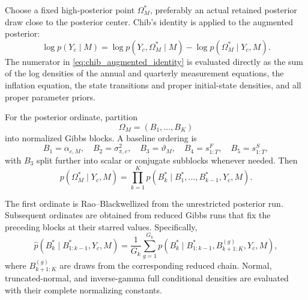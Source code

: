 \documentclass[11pt]{article}
\begin{document}
Choose a fixed high-posterior point \(\Omega_M^{\ast}\), preferably an actual retained posterior draw close to the posterior center. Chib's identity is applied to the augmented posterior:
\begin{equation}
\boxed{
\log p(Y_c\mid M)
=
\log p(Y_c,\Omega_M^{\ast}\mid M)
-
\log p(\Omega_M^{\ast}\mid Y_c,M).
}
\label{eq:chib_augmented_identity}
\end{equation}
The numerator in \cref{eq:chib_augmented_identity} is evaluated directly as the sum of the log densities of the annual and quarterly measurement equations, the inflation equation, the state transitions and proper initial-state densities, and all proper parameter priors.

For the posterior ordinate, partition
\begin{equation}
\Omega_M=(B_1,\ldots,B_K)
\end{equation}
into normalized Gibbs blocks. A baseline ordering is
\begin{equation}
B_1=\alpha_{c,M},
\quad
B_2=\sigma_{\pi,c}^2,
\quad
B_3=\vartheta_M,
\quad
B_4=s_{1:T}^F,
\quad
B_5=s_{1:T}^S,
\end{equation}
with \(B_3\) split further into scalar or conjugate subblocks whenever needed. Then
\begin{equation}
p(\Omega_M^{\ast}\mid Y_c,M)
=
\prod_{k=1}^{K}
p(B_k^{\ast}\mid B_1^{\ast},\ldots,B_{k-1}^{\ast},Y_c,M).
\label{eq:chib_ordinate_factorization}
\end{equation}

The first ordinate is Rao--Blackwellized from the unrestricted posterior run. Subsequent ordinates are obtained from reduced Gibbs runs that fix the preceding blocks at their starred values. Specifically,
\begin{equation}
\widehat p
\left(
B_k^{\ast}\mid B_{1:k-1}^{\ast},Y_c,M
\right)
=
\frac{1}{G_k}
\sum_{g=1}^{G_k}
p
\left(
B_k^{\ast}
\mid
B_{1:k-1}^{\ast},
B_{k+1:K}^{(g)},
Y_c,M
\right),
\label{eq:chib_rb_ordinate}
\end{equation}
where \(B_{k+1:K}^{(g)}\) are draws from the corresponding reduced chain. Normal, truncated-normal, and inverse-gamma full conditional densities are evaluated with their complete normalizing constants.
\end{document}

